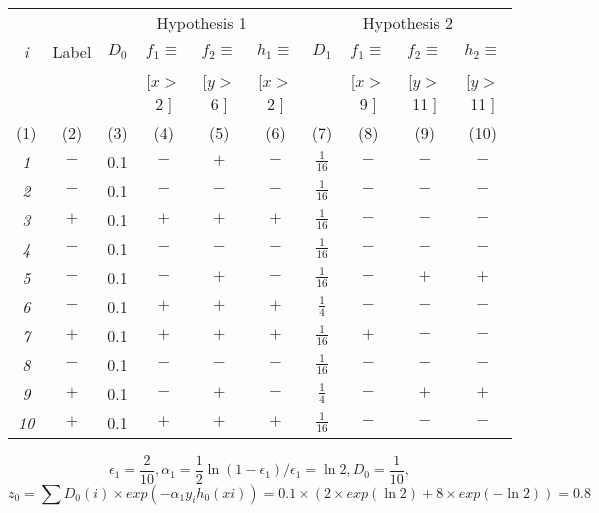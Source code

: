 \item[(a)(b)] \ \\
      \begin{tabular}{|c|c||c|c|c|c||c|c|c|c|}
        \hline
        & & \multicolumn{4}{c||}{Hypothesis 1} & \multicolumn{4}{c|}{Hypothesis 2} \\
        \cline{3-10}
        {\em i} & Label & $D_0$ & $f_1 \equiv $ & $f_2 \equiv $ & $h_1\equiv$ & $D_1$ &  $f_1 \equiv $ & $f_2 \equiv $ & $h_2 \equiv $ \\
        & & & [$x >$2$\;$] & [$y >$6$\;$] & [$x >$2$\;$] & & [$x >$9$\;$] & [$y >$11$\;$] & [$y >$11$\;$] \\

        \tiny{(1)} & \tiny{(2)} & \tiny{(3)} & \tiny{(4)} &  \tiny{(5)} & \tiny{(6)} & \tiny{(7)} & \tiny{(8)} & \tiny{(9)} & \tiny{(10)}\\
        \hline \hline
        {\em 1} & $-$ &0.1&$-$&$+$&$-$&$\frac{1}{16}$&$-$&$-$&$-$  \\
        \hline
        {\em 2} & $-$ &0.1&$-$&$-$&$-$&$\frac{1}{16}$&$-$&$-$&$-$  \\
        \hline
        {\em 3} & $+$ &0.1&$+$&$+$&$+$&$\frac{1}{16}$&$-$&$-$&$-$ \\
        \hline
        {\em 4} & $-$ &0.1&$-$&$-$&$-$&$\frac{1}{16}$&$-$&$-$&$-$ \\
        \hline
        {\em 5} & $-$ &0.1&$-$&$+$&$-$&$\frac{1}{16}$&$-$&$+$&$+$ \\
        \hline
        {\em 6} & $-$ &0.1&$+$&$+$&$+$&$\frac{1}{4}$&$-$&$-$&$-$ \\
        \hline
        {\em 7} & $+$ &0.1&$+$&$+$&$+$&$\frac{1}{16}$&$+$&$-$&$-$ \\
        \hline
        {\em 8} & $-$ &0.1&$-$&$-$&$-$&$\frac{1}{16}$&$-$&$-$&$-$ \\
        \hline
        {\em 9} & $+$ &0.1&$-$&$+$&$-$&$\frac{1}{4}$&$-$&$+$&$+$ \\
        \hline
        {\em 10} & $+$ &0.1&$+$&$+$&$+$&$\frac{1}{16}$&$-$&$-$&$-$ \\
        \hline
      \end{tabular}
\item[(c)]
\begin{equation*}
\epsilon_1 = \frac{2}{10}, \alpha_1 = \frac{1}{2} \ln{(1-\epsilon_1)/\epsilon_1} = \ln2, D_0 = \frac{1}{10},
\end{equation*}
\begin{equation*}
 z_0 = \sum D_0(i)\times exp(-\alpha_1 y_i h_0 (xi))= 0.1\times(2\times exp(\ln2)+8\times exp(-\ln2)) = 0.8
\end{equation*}
